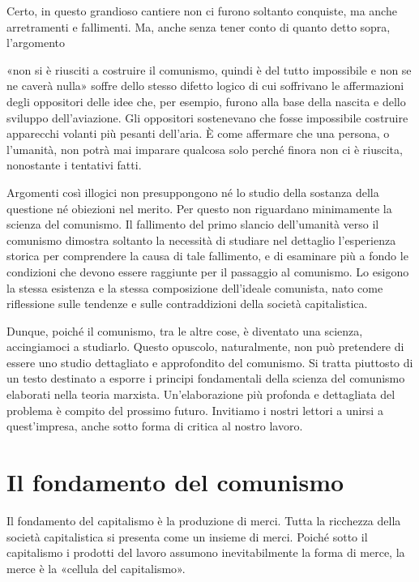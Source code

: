 \documentclass[12pt,a4paper,openany]{book}
\begin{document}
Certo, in questo grandioso cantiere non ci furono soltanto conquiste, ma anche arretramenti e fallimenti. Ma, anche senza tener conto di quanto detto sopra, l'argomento

«non si è riusciti a costruire il comunismo, quindi è del tutto impossibile e non se ne caverà nulla» soffre dello stesso difetto logico di cui soffrivano le affermazioni degli oppositori delle idee che, per esempio, furono alla base della nascita e dello sviluppo dell'aviazione. Gli oppositori sostenevano che fosse impossibile costruire apparecchi volanti più pesanti dell'aria. È come affermare che una persona, o l'umanità, non potrà mai imparare qualcosa solo perché finora non ci è riuscita, nonostante i tentativi fatti.

Argomenti così illogici non presuppongono né lo studio della sostanza della questione né obiezioni nel merito. Per questo non riguardano minimamente la scienza del comunismo. Il fallimento del primo slancio dell'umanità verso il comunismo dimostra soltanto la necessità di studiare nel dettaglio l'esperienza storica per comprendere la causa di tale fallimento, e di esaminare più a fondo le condizioni che devono essere raggiunte per il passaggio al comunismo. Lo esigono la stessa esistenza e la stessa composizione dell'ideale comunista, nato come riflessione sulle tendenze e sulle contraddizioni della società capitalistica.

Dunque, poiché il comunismo, tra le altre cose, è diventato una scienza, accingiamoci a studiarlo. Questo opuscolo, naturalmente, non può pretendere di essere uno studio dettagliato e approfondito del comunismo. Si tratta piuttosto di un testo destinato a esporre i principi fondamentali della scienza del comunismo elaborati nella teoria marxista. Un'elaborazione più profonda e dettagliata del problema è compito del prossimo futuro. Invitiamo i nostri lettori a unirsi a quest'impresa, anche sotto forma di critica al nostro lavoro.
\ifSubfilesClassLoaded{\setcounter{page}{14}}{}
\section{Il fondamento del comunismo}
\label{sec:03_fondamenti}

Il fondamento del capitalismo è la produzione di merci. Tutta la ricchezza della società capitalistica si presenta come un insieme di merci. Poiché sotto il capitalismo i prodotti del lavoro assumono inevitabilmente la forma di merce, la merce è la «cellula del capitalismo».
\end{document}
